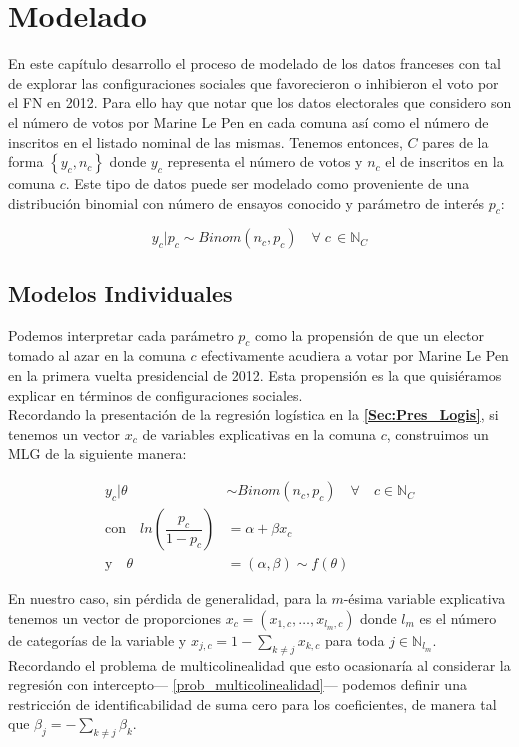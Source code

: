 \chapter{Modelado}

En este capítulo desarrollo el proceso de modelado de los datos franceses con tal de explorar las configuraciones sociales que favorecieron o inhibieron el voto por el FN en 2012. Para ello hay que notar que los datos electorales que considero son el número de votos por Marine Le Pen en cada comuna así como el número de inscritos en el listado nominal de las mismas. Tenemos entonces, $C$ pares de la forma $\left\lbrace y_c, n_c \right\rbrace$ donde $y_c$ representa el número de votos y $n_c$ el de inscritos en la comuna $c$. Este tipo de datos puede ser modelado como proveniente de una distribución binomial con número de ensayos conocido y parámetro de interés $p_c$: 

\begin{equation*}
y_c|p_c \sim Binom(n_c, p_c) \quad \forall \; c \, \in \mathbb{N}_C
\end{equation*} 

\section{Modelos Individuales}

Podemos interpretar cada parámetro $p_c$ como la propensión de que un elector tomado al azar en la comuna $c$ efectivamente acudiera a votar por Marine Le Pen en la primera vuelta presidencial de 2012. Esta propensión es la que quisiéramos explicar en términos de configuraciones sociales.\\ 

Recordando la presentación de la regresión logística en la \textbf{\autoref{Sec:Pres_Logis}}, si tenemos un vector $x_c$ de variables explicativas en la comuna $c$, construimos un MLG de la siguiente manera: 

\begin{align*}
y_c|\theta & \sim Binom(n_c,p_c) \quad \forall \quad c \in \mathbb{N}_C \\
\text{con} \quad ln\left(\dfrac{p_c}{1-p_c}\right) &= \alpha + \beta x_c \nonumber \\
\text{y} \quad \theta &= (\alpha,\beta) \sim f(\theta)
\end{align*}

En nuestro caso, sin pérdida de generalidad, para la $m$-ésima variable explicativa tenemos un vector de proporciones $x_c=(x_{1,c},\dots,x_{l_m,c})$ donde $l_m$ es el número de categorías de la variable y $x_{j,c}=1 - \sum_{k\neq j} x_{k,c}$ para toda $j \in \mathbb{N}_{l_m}$. Recordando el problema de multicolinealidad que esto ocasionaría al considerar la regresión con intercepto--- \autoref{prob_multicolinealidad}--- podemos definir una restricción de identificabilidad de suma cero para los coeficientes, de manera tal que $\beta_j=-\sum\limits_{k\neq j}\beta_k$.\\

